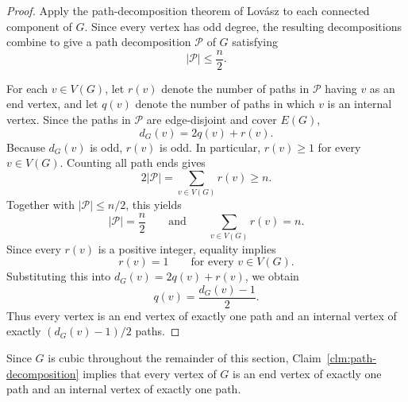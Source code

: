 \documentclass[preprint,12pt]{elsarticle}
\begin{document}
\begin{proof}
Apply the path-decomposition theorem of Lov\'asz
\cite{lovasz1968covering} to each connected component of \(G\). Since
every vertex has odd degree, the resulting decompositions combine to give
a path decomposition \(\mathcal P\) of \(G\) satisfying
\[
|\mathcal P|\le \frac{n}{2}.
\]

For each \(v\in V(G)\), let \(r(v)\) denote the number of paths in
\(\mathcal P\) having \(v\) as an end vertex, and let \(q(v)\) denote the
number of paths in which \(v\) is an internal vertex. Since the paths in
\(\mathcal P\) are edge-disjoint and cover \(E(G)\),
\[
d_G(v)=2q(v)+r(v).
\]
Because \(d_G(v)\) is odd, \(r(v)\) is odd. In particular, \(r(v)\ge1\)
for every \(v\in V(G)\). Counting all path ends gives
\[
2|\mathcal P|
=
\sum_{v\in V(G)}r(v)
\ge n.
\]
Together with \(|\mathcal P|\le n/2\), this yields
\[
|\mathcal P|=\frac{n}{2}
\qquad\text{and}\qquad
\sum_{v\in V(G)}r(v)=n.
\]
Since every \(r(v)\) is a positive integer, equality implies
\[
r(v)=1
\qquad\text{for every }v\in V(G).
\]
Substituting this into \(d_G(v)=2q(v)+r(v)\), we obtain
\[
q(v)=\frac{d_G(v)-1}{2}.
\]
Thus every vertex is an end vertex of exactly one path and an internal
vertex of exactly \((d_G(v)-1)/2\) paths.
\end{proof}

Since \(G\) is cubic throughout the remainder of this section,
Claim~\ref{clm:path-decomposition} implies that every vertex of \(G\) is
an end vertex of exactly one path and an internal vertex of exactly one
path.
\end{document}
